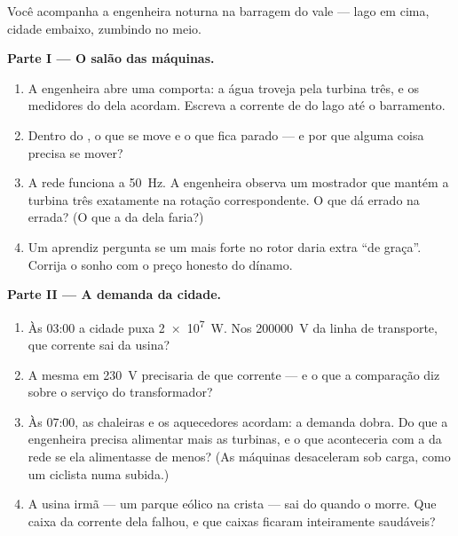 \begin{problem}\label{pb:g9:alternator:1}
Você acompanha a engenheira noturna na barragem do vale --- lago em
cima, cidade embaixo,  zumbindo no meio.

\medskip\noindent\textbf{Parte I --- O salão das máquinas.}
\begin{enumerate}
  \item A engenheira abre uma comporta: a água troveja pela turbina
        três, e os medidores do  dela acordam. Escreva a
        corrente de  do lago até o barramento.
  \item Dentro do , o que se move e o que fica parado --- e
        por que alguma coisa precisa se mover?
  \item A rede funciona a \qty{50}{Hz}. A engenheira observa um
        mostrador que mantém a turbina três exatamente na rotação
        correspondente. O que dá errado na  errada? (O que
        a  da  dela faria?)
  \item Um aprendiz pergunta se um  mais forte no rotor daria
         extra ``de graça''. Corrija o sonho com o preço
        honesto do dínamo.
\end{enumerate}

\medskip\noindent\textbf{Parte II --- A demanda da cidade.}
\begin{enumerate}[resume]
  \item Às 03:00 a cidade puxa \qty{2e7}{W}. Nos \qty{200000}{V} da
        linha de transporte, que corrente sai da usina?
  \item A mesma  em \qty{230}{V} precisaria de que corrente
        --- e o que a comparação diz sobre o serviço do
        transformador?
  \item Às 07:00, as chaleiras e os aquecedores acordam: a demanda
        dobra. Do que a engenheira precisa alimentar mais as
        turbinas, e o que aconteceria com a  da rede se ela
        alimentasse de menos? (As máquinas desaceleram sob carga,
        como um ciclista numa subida.)
  \item A usina irmã --- um parque eólico na crista --- sai do 
        quando o  morre. Que caixa da corrente dela falhou, e
        que caixas ficaram inteiramente saudáveis?
\end{enumerate}


\end{problem}
